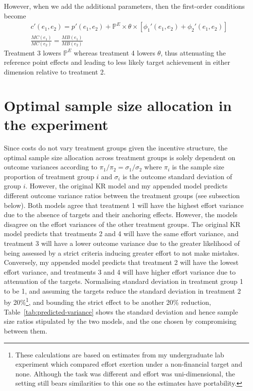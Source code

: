 \documentclass[12pt, letterpaper]{article}
\begin{document}
However, when we add the additional parameters, then the first-order conditions become
\[
\begin{aligned}
& c'(e_1, e_2) = p'(e_1, e_2) + \mathbb{P}^E \times \theta \times [\phi_1'(e_1, e_2) + \phi_2'(e_1, e_2)] \\
& \frac {MC(e_1)}{MC(e_2)} = \frac {MB(e_1)}{MB(e_2)}
\end{aligned}
\]
Treatment 3 lowers $\mathbb{P}^E$ whereas treatment 4 lowers $\theta$, thus attenuating the reference point effects and leading to less likely target achievement in either dimension relative to treatment 2.

\section{Optimal sample size allocation in the experiment}\label{app:sample-size}

Since costs do not vary treatment groups given the incentive structure, the optimal sample size allocation across treatment groups is solely dependent on outcome variances according to $\pi_1/\pi_2 = \sigma_1/\sigma_2$ where $\pi_i$ is the sample size proportion of treatment group $i$ and $\sigma_i$ is the outcome standard deviation of group $i$. However, the original KR model and my appended model predicts different outcome variance ratios between the treatment groups (see subsection below). Both models agree that treatment 1 will have the highest effort variance due to the absence of targets and their anchoring effects. However, the models disagree on the effort variances of the other treatment groups. The original KR model predicts that treatments 2 and 4 will have the same effort variance, and treatment 3 will have a lower outcome variance due to the greater likelihood of being assessed by a strict criteria inducing greater effort to not make mistakes. Conversely, my appended model predicts that treatment 2 will have the lowest effort variance, and treatments 3 and 4 will have higher effort variance due to attenuation of the targets. Normalising standard deviation in treatment group 1 to be 1, and assuming the targets reduce the standard deviation in treatment 2 by 20\%\footnote{These calculations are based on estimates from my undergraduate lab experiment which compared effort exertion under a non-financial target and none. Although the task was different and effort was uni-dimensional, the setting still bears similarities to this one so the estimates have portability.}, and bounding the strict effect to be another 20\% reduction, Table~\ref{tab:predicted-variance} shows the standard deviation and hence sample size ratios stipulated by the two models, and the one chosen by compromising between them.
\end{document}
